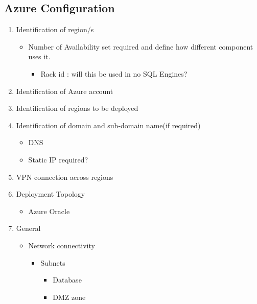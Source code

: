 \documentclass[letterpaper,10pt,english]{sphinxmanual}
\begin{document}
\subsection{Azure Configuration}
\label{\detokenize{loom_installation_guide:azure-configuration}}\begin{enumerate}
\item {} 
Identification of region/s
\begin{itemize}
\item {} 
Number of Availability set required and define how different component uses it.
\begin{itemize}
\item {} 
Rack id : will this be used in no SQL Engines?

\end{itemize}

\end{itemize}

\item {} 
Identification of Azure account

\item {} 
Identification of regions to be deployed

\item {} 
Identification of domain and sub-domain name(if required)
\begin{itemize}
\item {} 
DNS

\item {} 
Static IP required?

\end{itemize}

\item {} 
VPN connection across regions

\item {} 
Deployment Topology
\begin{itemize}
\item {} 
Azure \textbar{} Oracle

\end{itemize}

\item {} 
General
\begin{itemize}
\item {} 
Network connectivity
\begin{itemize}
\item {} 
Subnets
\begin{itemize}
\item {} 
Database

\item {} 
DMZ zone


\end{itemize}
\end{itemize}
\end{itemize}
\end{enumerate}
\end{document}
